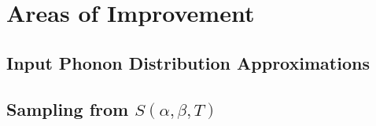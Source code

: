 \documentclass[../master.tex]{subfiles}
\begin{document}









	\section{Areas of Improvement}
		\subsection{Input Phonon Distribution Approximations}

		\subsection{Sampling from $S(\alpha,\beta,T)$}
\end{document}
